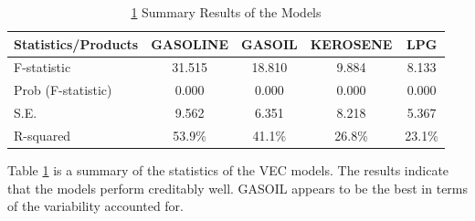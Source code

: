 \documentclass{beamer}
\begin{document}
	\begin{frame}
		\begin{table}
			\caption{ \ref{table:model_summary} Summary Results of the Models}
			\label{table:model_summary}
			\begin{tabular}{lcccc}
				\toprule
				Statistics/Products & GASOLINE & GASOIL & KEROSENE & LPG \\
				\midrule
				
				F-statistic         & 31.515 & 18.810 & 9.884 & 8.133 \\ [10pt]
				Prob (F-statistic)  & 0.000 & 0.000 & 0.000 & 0.000   \\ [10pt]
				S.E.                & 9.562 & 6.351 & 8.218 & 5.367   \\ [10pt]
				R-squared           & 53.9\% & 41.1\% & 26.8\% & 23.1\% \\ [10pt]
				\bottomrule
			\end{tabular}
		\end{table}
	
		\begin{exampleblock}{}
			Table \ref{table:model_summary} is a summary of the statistics of the VEC models. The results indicate that the models perform creditably well. GASOIL appears to be the best in terms of the variability accounted for.
		\end{exampleblock}
	\end{frame}

	
\end{document}
